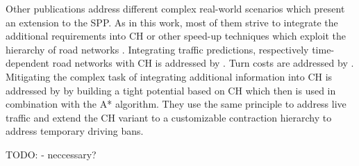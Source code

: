 Other publications address different complex real-world scenarios which present an extension to the SPP. As in this work, most of them strive to integrate the additional requirements into CH or other speed-up techniques which exploit the hierarchy of road networks \cite{bast:2015}. Integrating traffic predictions, respectively time-dependent road networks with CH is addressed by \cite{batz:2009,batz:2013}. Turn costs are addressed by \cite{geisberger:2011}. Mitigating the complex task of integrating additional information into CH is addressed by \cite{strasser:2021} by building a tight potential based on CH which then is used in combination with the A* algorithm. They use the same principle to address live traffic and extend the CH variant to a customizable contraction hierarchy \cite{dibbelt:2015} to address temporary driving bans.

TODO: \cite{mayerle:2020} - neccessary?